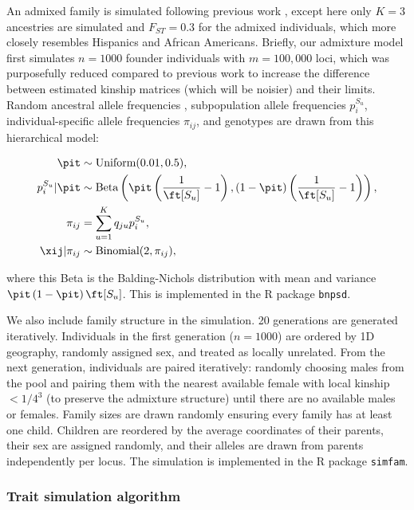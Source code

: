 \documentclass[11pt]{article}
\begin{document}
\begin{linenumbers}
An admixed family is simulated following previous work \citep{yao_limitations_2022}, except here only $K=3$ ancestries are simulated and $F_{ST}=0.3$ for the admixed individuals, which more closely resembles Hispanics and African Americans.
Briefly, our admixture model first simulates $n=1000$ founder individuals with $m=100,000$ loci, which was purposefully reduced compared to previous work to increase the difference between estimated kinship matrices (which will be noisier) and their limits.
Random ancestral allele frequencies \pit, subpopulation allele frequencies $p_i^{S_u}$, individual-specific allele frequencies $\pi_{ij}$, and genotypes \xij are drawn from this hierarchical model:
\begin{linenomath*}
\begin{align*}
  \pit
  &\sim
    \text{Uniform}( 0.01, 0.5 )
    , \\
  p_i^{S_u} | \pit
  &\sim
    \text{Beta} \left(
    \pit \left( \frac{1}{ \ft[S_u] } - 1 \right),
    \left( 1 - \pit \right) \left( \frac{1}{ \ft[S_u] } - 1 \right)
    \right)
    , \\
  \pi_{ij}
  &=
    \sum_{u = 1}^K q_{ju} p_i^{S_u}
    , \\
  \xij | \pi_{ij}
  &\sim
    \text{Binomial}(2, \pi_{ij})
    ,
\end{align*}
\end{linenomath*}
where this Beta is the Balding-Nichols distribution \citep{balding_method_1995} with mean \pit and variance $\pit \left( 1 - \pit \right) \ft[S_u]$.
This is implemented in the R package \texttt{bnpsd}.

We also include family structure in the simulation.
20 generations are generated iteratively.
Individuals in the first generation ($n=1000$) are ordered by 1D geography, randomly assigned sex, and treated as locally unrelated. 
From the next generation, individuals are paired iteratively: randomly choosing males from the pool and pairing them with the nearest available female with local kinship $<1/4^3$ (to preserve the admixture structure) until there are no available males or females.
Family sizes are drawn randomly ensuring every family has at least one child.
Children are reordered by the average coordinates of their parents, their sex are assigned randomly, and their alleles are drawn from parents independently per locus.
The simulation is implemented in the R package \texttt{simfam}.

\subsubsection{Trait simulation algorithm}


\end{linenumbers}
\end{document}
